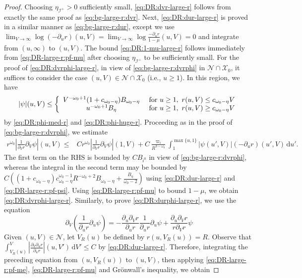 \documentclass[10pt, reqno]{amsart}
\theoremstyle{definition}
\theoremstyle{remark}
\theoremstyle{conjecture}
\numberwithin{equation}{section}
\newcommand{\abs}[1]{\vert#1\vert}
\newcommand{\set}[1]{\{#1\}}
\newcommand{\ud}{\mathrm{d}}
\newcommand{\rd}{\partial}
\newcommand{\0}{\emptyset}
\newcommand{\omg}{\omega}
\newcommand{\calI}{\mathcal I}
\newcommand{\calN}{\mathcal N}
\newcommand{\calX}{\mathcal X}
\newcommand{\f}{\frac}
\newcommand{\NI}{\calI^{+}}						%
\newcommand{\Abs}[1]{\left\vert #1 \right\vert}
\begin{document}
\begin{proof}
Choosing $\eta_{\NI} > 0$ sufficiently small, \eqref{eq:DR:dvr-large-r} follows from exactly the same proof as \eqref{eq:bg-large-r:dvr}. Next, \eqref{eq:DR:dur-large-r} is proved in a similar manner as \eqref{eq:bg-large-r:dur}, except we use $\lim_{V \to \infty} \log (-\rd_{u} r) (u, V) = \lim_{V \to \infty} \log \frac{-\rd_{u} r}{1-\mu} (u, V)=0$ and integrate from $(u, \infty)$ to $(u, V)$. The bound \eqref{eq:DR:1-mu-large-r} follows immediately from \eqref{eq:DR-large-r:pf-mu} after choosing $\eta_{\NI}$ to be sufficiently small. For the proof of \eqref{eq:DR:dvrphi-large-r}, in view of \eqref{eq:bg-large-r:dvrphi} in $\underline{\calN} \cap \calX_{0}$, it suffices to consider the case $(u, V) \in \calN \cap \calX_{0}$ (i.e., $u \geq 1$). In this region, we have 
\begin{equation} \label{eq:DR-large-r:pf-psi}
\abs{\psi} (u, V) \leq \left\{
\begin{array}{cl}
	V^{-\omg_{0}+1} (1+c_{\omg_{0} - \eta}) B_{\omg_{0} - \eta} & \hbox{ for } u \geq 1,\ r(u, V) \leq c_{\omg_{0} - \eta} V \\
	u^{-\omg_{0}+1} B_{\eta} & \hbox{ for } u \geq 1,\ r(u, V) \geq c_{\omg_{0} - \eta} V 
\end{array} \right.
\end{equation}
by \eqref{eq:DR:phi-med-r} and \eqref{eq:DR:phi-huge-r}. Proceeding as in the proof of \eqref{eq:bg-large-r:dvrphi}, we estimate
\begin{align*}
	r^{\omg_{0}} \Abs{\frac{1}{\rd_{V} r} \rd_{V} \psi}(u, V)
	\leq & C r^{\omg_{0}} \Abs{\frac{1}{\rd_{V} r} \rd_{V} \psi}(1, V) 
	 + C \frac{\varpi_{i}}{R^{3-\omg_{0}}} \int_{1}^{\max\set{u, 1}} \abs{\psi(u', V)} (-\rd_{u} r)(u', V)\, \ud u' .
\end{align*}
The first term on the RHS is bounded by $C B_{i^{0}}$ in view of \eqref{eq:bg-large-r:dvrphi}, whereas the integral in the second term may be bounded by $C ((1+c_{\omg_0-\eta}) c_{\omg_{0}-\eta}^{\omg_{0}-1} R^{-\omg_{0}+2} B_{\omg_{0} - \eta} + \f{B_{\eta}}{\omg_0-2})$ using \eqref{eq:DR:dur-large-r} and \eqref{eq:DR-large-r:pf-psi}. Using \eqref{eq:DR-large-r:pf-mu} to bound $1-\mu$, we obtain \eqref{eq:DR:dvrphi-large-r}. Similarly, to prove \eqref{eq:DR:durphi-large-r}, we use the equation
\begin{equation*}
	\rd_{V} \left( \frac{1}{\rd_{u} r} \rd_{u} \psi\right)
	= - \frac{\rd_{u} \rd_{V} r}{\rd_{u} r} \frac{1}{\rd_{u} r} \rd_{u} \psi + \frac{\rd_{u} \rd_{V} r}{r \rd_{V} r} \psi
\end{equation*}
Given $(u, V) \in \calN$, let $V_{R}(u)$ be defined by $r (u, V_{R}(u)) = R$. Observe that $\int_{V_{R}(u)}^{V} \Abs{\frac{\rd_{V} \rd_{u} r}{\rd_{u} r}}(u, V') \, \ud V' \leq C$ by \eqref{eq:DR:dur-large-r}. Therefore, integrating the preceding equation from $(u, V_{R}(u))$ to $(u, V)$, then applying \eqref{eq:DR-large-r:pf-me}, \eqref{eq:DR-large-r:pf-mu} and Gr\"onwall's inequality, we obtain

\end{proof}
\end{document}
